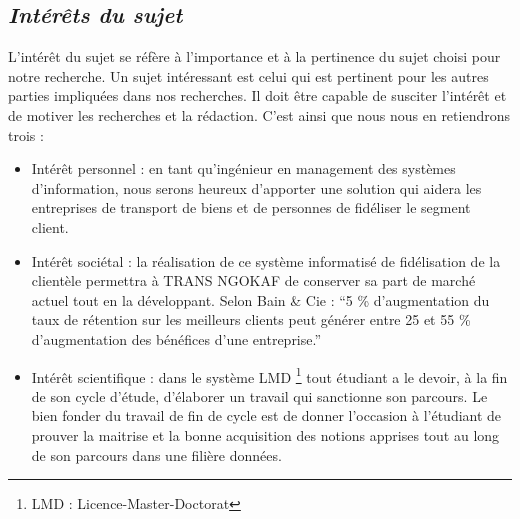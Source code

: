         \subsection[Interet du sujet]{\textit{Intérêts du sujet}}
        L’intérêt du sujet se réfère à l’importance et à la pertinence du sujet choisi pour notre recherche.
        Un sujet intéressant est celui qui est pertinent pour les autres parties impliquées dans nos recherches.
        Il doit être capable de susciter l’intérêt et de motiver les recherches et la rédaction. C’est ainsi
        que nous nous en retiendrons trois :
         \par 
            \begin{itemize}
                \setlength{\itemsep}{0pt}
                \item [\ding{226}] Intérêt personnel : en tant qu’ingénieur en management 
                des systèmes d’information, nous serons heureux d’apporter une solution
                qui aidera les entreprises de transport de biens et de personnes de fidéliser
                le segment client.
                \item [\ding{226}] Intérêt sociétal : la réalisation de ce système
                informatisé de fidélisation de la clientèle permettra à TRANS NGOKAF
                de conserver sa part de marché actuel tout en la développant. 
                Selon Bain \& Cie : \enquote{5 \% d’augmentation du taux de
                rétention sur les meilleurs clients peut générer entre 25 et 55 \%
                d’augmentation des bénéfices d’une entreprise.} \cite*{Siecdigi}
                \item [\ding{226}] Intérêt scientifique : dans le système LMD
                \footnote[1]{LMD : Licence-Master-Doctorat} tout étudiant
                a le devoir, à la fin de son cycle d’étude, d’élaborer un travail qui
                sanctionne son parcours. Le bien fonder du travail de fin de cycle
                est de donner l’occasion à l’étudiant de prouver la maitrise et la bonne acquisition
                des notions apprises tout au long de son parcours dans une filière données.
            \end{itemize}
